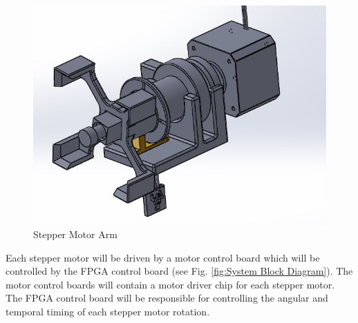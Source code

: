\documentclass[final, letterpaper, 10 pt, conference, onecolumn]{IEEEtran}
\begin{document}
\begin{figure}[!ht]
\centering
\includegraphics[scale=0.5]{StepperMotorArm.jpg}
\caption{Stepper Motor Arm}
\label{fig:Stepper Motor Arm}
\end{figure}

Each stepper motor will be driven by a motor control board which will be controlled by the FPGA control board (see Fig. \ref{fig:System Block Diagram}). The motor control boards will contain a motor driver chip for each stepper motor. The FPGA control board will be responsible for controlling the angular and temporal timing of each stepper motor rotation.
\end{document}
